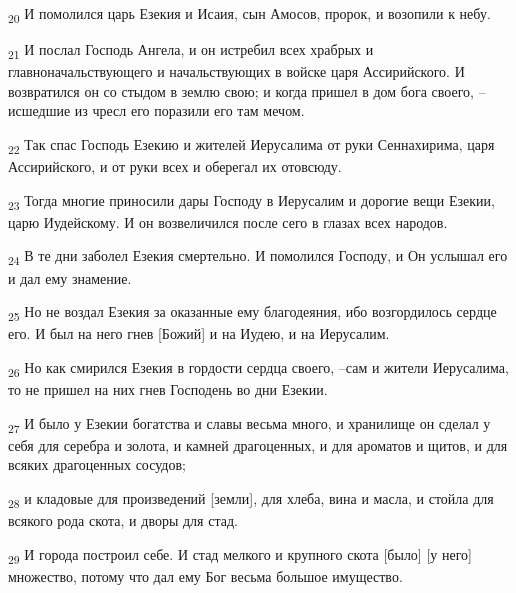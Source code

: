 \begin{tcolorbox}
\textsubscript{20} И помолился царь Езекия и Исаия, сын Амосов, пророк, и возопили к небу.
\end{tcolorbox}
\begin{tcolorbox}
\textsubscript{21} И послал Господь Ангела, и он истребил всех храбрых и главноначальствующего и начальствующих в войске царя Ассирийского. И возвратился он со стыдом в землю свою; и когда пришел в дом бога своего, --исшедшие из чресл его поразили его там мечом.
\end{tcolorbox}
\begin{tcolorbox}
\textsubscript{22} Так спас Господь Езекию и жителей Иерусалима от руки Сеннахирима, царя Ассирийского, и от руки всех и оберегал их отовсюду.
\end{tcolorbox}
\begin{tcolorbox}
\textsubscript{23} Тогда многие приносили дары Господу в Иерусалим и дорогие вещи Езекии, царю Иудейскому. И он возвеличился после сего в глазах всех народов.
\end{tcolorbox}
\begin{tcolorbox}
\textsubscript{24} В те дни заболел Езекия смертельно. И помолился Господу, и Он услышал его и дал ему знамение.
\end{tcolorbox}
\begin{tcolorbox}
\textsubscript{25} Но не воздал Езекия за оказанные ему благодеяния, ибо возгордилось сердце его. И был на него гнев [Божий] и на Иудею, и на Иерусалим.
\end{tcolorbox}
\begin{tcolorbox}
\textsubscript{26} Но как смирился Езекия в гордости сердца своего, --сам и жители Иерусалима, то не пришел на них гнев Господень во дни Езекии.
\end{tcolorbox}
\begin{tcolorbox}
\textsubscript{27} И было у Езекии богатства и славы весьма много, и хранилище он сделал у себя для серебра и золота, и камней драгоценных, и для ароматов и щитов, и для всяких драгоценных сосудов;
\end{tcolorbox}
\begin{tcolorbox}
\textsubscript{28} и кладовые для произведений [земли], для хлеба, вина и масла, и стойла для всякого рода скота, и дворы для стад.
\end{tcolorbox}
\begin{tcolorbox}
\textsubscript{29} И города построил себе. И стад мелкого и крупного скота [было] [у него] множество, потому что дал ему Бог весьма большое имущество.
\end{tcolorbox}

